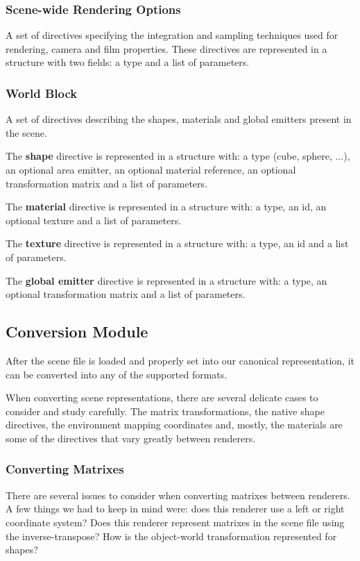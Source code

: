 \subsubsection{Scene-wide Rendering Options}
A set of directives specifying the integration and sampling techniques used for 
rendering, camera and film properties. These directives are represented in a 
structure with two fields: a type and a list of parameters.

\subsubsection{World Block}
A set of directives describing the shapes, materials and global emitters present 
in the scene. 

The \textbf{shape} directive is represented in a structure with: a type (cube, 
sphere, ...), an optional area emitter, an optional material reference, an 
optional transformation matrix and a list of parameters. 

The \textbf{material} directive is represented in a structure with: a type, an 
id, an optional texture and a list of parameters.

The \textbf{texture} directive is represented in a structure with: a type, an id 
and a list of parameters.

The \textbf{global emitter} directive is represented in a structure with: a 
type, an optional transformation matrix and a list of parameters.

\subsection{Conversion Module}
After the scene file is loaded and properly set into our canonical 
representation, it can be converted into any of the supported formats.

When converting scene representations, there are several delicate cases to 
consider and study carefully. The matrix transformations, the native shape 
directives, the environment mapping coordinates and, mostly, the materials are 
some of the directives that vary greatly between renderers. 

\subsubsection{Converting Matrixes}
There are several issues to consider when converting matrixes between renderers. 
A few things we had to keep in mind were: does this renderer use a left or right 
coordinate system? Does this renderer represent matrixes in the scene file using 
the inverse-transpose? How is the object-world transformation represented for 
shapes?

